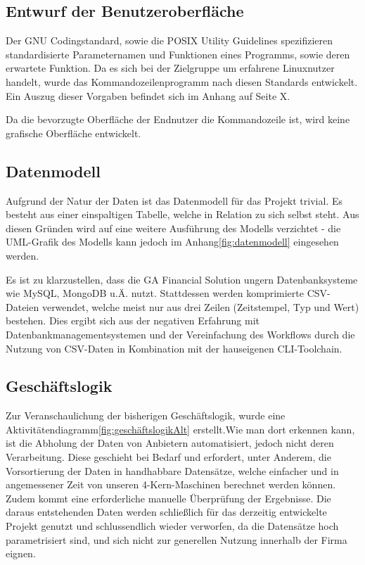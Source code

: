 

\subsection{Entwurf der Benutzeroberfläche}
Der GNU Codingstandard\cite{gnuCodingStandard},
sowie die POSIX Utility Guidelines\cite{posixGuidelines}
spezifizieren standardisierte Parameternamen und Funktionen eines Programms, sowie
deren erwartete Funktion. Da es sich bei der Zielgruppe um erfahrene Linuxnutzer handelt, wurde das Kommandozeilenprogramm nach diesen Standards entwickelt. Ein Auszug dieser Vorgaben befindet sich im Anhang auf Seite X.\par

Da die bevorzugte Oberfläche der Endnutzer die Kommandozeile ist, wird keine grafische Oberfläche entwickelt.

\subsection{Datenmodell}
Aufgrund der Natur der Daten ist das Datenmodell für das Projekt trivial. Es besteht aus einer
einspaltigen Tabelle, welche in Relation zu sich selbst steht. Aus diesen Gründen wird auf eine weitere Ausführung des 
Modells verzichtet - die UML-Grafik des Modells kann jedoch im Anhang\ref{fig:datenmodell} eingesehen werden.

Es ist zu klarzustellen, dass die GA Financial Solution ungern Datenbanksysteme wie
MySQL, MongoDB u.Ä. nutzt. Stattdessen werden komprimierte CSV-Dateien verwendet, welche
meist nur aus drei Zeilen (Zeitstempel, Typ und Wert) bestehen. Dies ergibt sich aus
der negativen Erfahrung mit Datenbankmanagementsystemen und der Vereinfachung des Workflows durch
die Nutzung von CSV-Daten in Kombination mit der hauseigenen CLI-Toolchain.


\subsection{Geschäftslogik}
Zur Veranschaulichung der bisherigen Geschäftslogik, wurde eine Aktivitätendiagramm\ref{fig:geschäftslogikAlt} 
erstellt.Wie man dort erkennen kann, ist die Abholung der Daten von Anbietern automatisiert, jedoch nicht deren Verarbeitung.
Diese geschieht bei Bedarf und erfordert, unter Anderem, die Vorsortierung der Daten in handhabbare Datensätze, welche einfacher und in angemessener Zeit von unseren 4-Kern-Maschinen
berechnet werden können. Zudem kommt eine erforderliche manuelle Überprüfung
der Ergebnisse. Die daraus entstehenden Daten werden schließlich für das derzeitig entwickelte Projekt
genutzt und schlussendlich wieder verworfen, da die Datensätze hoch parametrisiert sind, und sich nicht zur generellen Nutzung innerhalb der Firma eignen.\par



